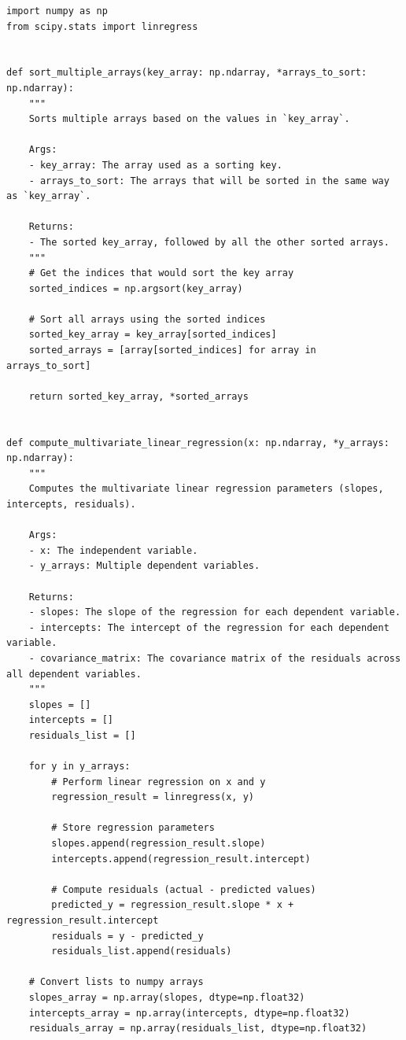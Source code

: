 \begin{lstlisting}[caption={mnn\_torch/utils.py},label={lst:mnn-src-utils}]
import numpy as np
from scipy.stats import linregress


def sort_multiple_arrays(key_array: np.ndarray, *arrays_to_sort: np.ndarray):
    """
    Sorts multiple arrays based on the values in `key_array`.

    Args:
    - key_array: The array used as a sorting key.
    - arrays_to_sort: The arrays that will be sorted in the same way as `key_array`.

    Returns:
    - The sorted key_array, followed by all the other sorted arrays.
    """
    # Get the indices that would sort the key array
    sorted_indices = np.argsort(key_array)

    # Sort all arrays using the sorted indices
    sorted_key_array = key_array[sorted_indices]
    sorted_arrays = [array[sorted_indices] for array in arrays_to_sort]

    return sorted_key_array, *sorted_arrays


def compute_multivariate_linear_regression(x: np.ndarray, *y_arrays: np.ndarray):
    """
    Computes the multivariate linear regression parameters (slopes, intercepts, residuals).

    Args:
    - x: The independent variable.
    - y_arrays: Multiple dependent variables.

    Returns:
    - slopes: The slope of the regression for each dependent variable.
    - intercepts: The intercept of the regression for each dependent variable.
    - covariance_matrix: The covariance matrix of the residuals across all dependent variables.
    """
    slopes = []
    intercepts = []
    residuals_list = []

    for y in y_arrays:
        # Perform linear regression on x and y
        regression_result = linregress(x, y)

        # Store regression parameters
        slopes.append(regression_result.slope)
        intercepts.append(regression_result.intercept)

        # Compute residuals (actual - predicted values)
        predicted_y = regression_result.slope * x + regression_result.intercept
        residuals = y - predicted_y
        residuals_list.append(residuals)

    # Convert lists to numpy arrays
    slopes_array = np.array(slopes, dtype=np.float32)
    intercepts_array = np.array(intercepts, dtype=np.float32)
    residuals_array = np.array(residuals_list, dtype=np.float32)


\end{lstlisting}
